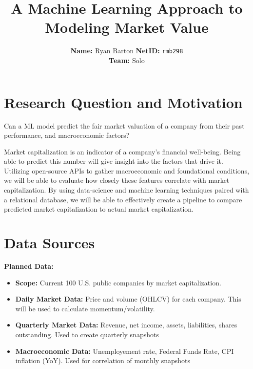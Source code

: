 \documentclass[12pt]{article}
\title{\textbf{A Machine Learning Approach to Modeling Market Value}}
\author{
\textbf{Name:} Ryan Barton \quad \textbf{NetID:} \texttt{rmb298} \\
\textbf{Team:} Solo
}
\date{}
\begin{document}
\maketitle

\section*{Research Question and Motivation}
\begin{description}[leftmargin=2.25em]
\item[\textbf{Research Question:}]
Can a ML model predict the fair market valuation of a company from their past performance, and macroeconomic factors?
\item[\textbf{Motivation:}]
Market capitalization is an indicator of a company's financial well‑being.  
Being able to predict this number will give insight into the factors that drive it.
Utilizing open‑source APIs to gather macroeconomic and foundational conditions, we will be able to evaluate how closely these features correlate with market capitalization. 
By using data‑science and machine learning techniques paired with a relational database, we will be able to effectively create a pipeline to compare predicted market capitalization to actual market capitalization.
\end{description}
\section*{Data Sources}

\noindent\textbf{Planned Data:}
\begin{itemize}[leftmargin=2.25em]
  \item \textbf{Scope:} Current 100 U.S. public companies by market capitalization.
  \item \textbf{Daily Market Data:} Price and volume (OHLCV) for each company. This will be used to calculate momentum/volatility.
  \item \textbf{Quarterly Market Data:} Revenue, net income, assets, liabilities, shares outstanding. Used to create quarterly snapshots
  \item \textbf{Macroeconomic Data:} Unemployement rate, Federal Funds Rate, CPI inflation (YoY). Used for correlation of monthly snapshots
\end{itemize}
\end{document}
